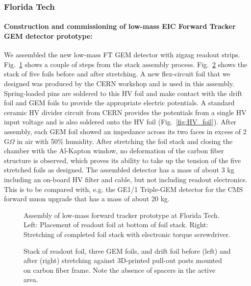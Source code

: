 \subsubsection{Florida Tech} 

\paragraph*{Construction and commissioning of low-mass EIC Forward Tracker GEM detector prototype:}

We assembled the new low-mass FT GEM detector with zigzag readout strips. Fig.~\ref{fig:Low-mass detector assembly} shows a couple of steps from the stack assembly process. Fig.~\ref{fig:Before and after stretching} shows the stack of five foils before and after stretching.  A new flex-circuit foil that we designed was produced by the CERN workshop and is used in this assembly. Spring-loaded pins are soldered to this HV foil and make contact with the drift foil and GEM foils to provide the appropriate electric potentials. A standard ceramic HV divider circuit from CERN provides the potentials from a single HV input voltage and is also soldered onto the HV foil (Fig.~\ref{fig:HV_foil}). After assembly, each GEM foil showed an impedance across its two faces in excess of 2 G$\Omega$ in air with 50\% humidity. After stretching the foil stack and closing the chamber with the Al-Kapton window, no deformation of the carbon fiber structure is observed, which proves its ability to take up the tension of the five stretched foils as designed. The assembled detector has a mass of about 3 kg including an on-board HV filter and cable, but not including readout electronics. This is to be compared with, e.g. the GE1/1 Triple-GEM detector for the CMS forward muon upgrade that has a mass of about 20 kg.

\begin{figure}
	\centering
	\caption{\label{fig:Low-mass detector assembly}Assembly of low-mass forward tracker prototype at Florida Tech. Left: Placement of readout foil at bottom of foil stack. Right: Stretching of completed foil stack with electronic torque screwdriver.}	
\end{figure}

\begin{figure}
	\centering
	\caption{\label{fig:Before and after stretching}Stack of readout foil, three GEM foils, and drift foil before (left) and after (right) stretching against 3D-printed pull-out posts mounted on carbon fiber frame. Note the absence of spacers in the active area.}	
\end{figure}

